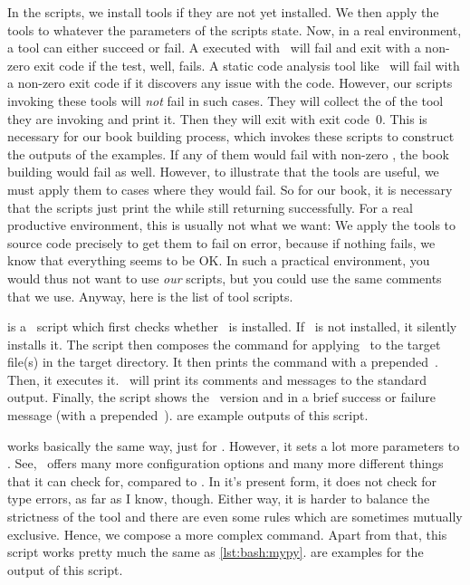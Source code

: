 In the scripts, we install tools if they are not yet installed.
We then apply the tools to whatever the parameters of the scripts state.
Now, in a real environment, a tool can either succeed or fail.
A  executed with \pytest\ will fail and exit with a non-zero exit code if the test, well, fails.
A static code analysis tool like \ruff\ will fail with a non-zero exit code if it discovers any issue with the code.
However, our scripts invoking these tools will \emph{not} fail in such cases.
They will collect the  of the tool they are invoking and print it.
Then they will exit with exit code~0.
This is necessary for our book building process, which invokes these scripts to construct the outputs of the examples.
If any of them would fail with non-zero , the book building would fail as well.
However, to illustrate that the tools are useful, we must apply them to cases where they would fail.
So for our book, it is necessary that the scripts just print the  while still returning successfully.
For a real productive environment, this is usually not what we want:
We apply the tools to source code precisely to get them to fail on error, because if nothing fails, we know that everything seems to be OK.
In such a practical environment, you would thus not want to use \emph{our} scripts, but you could use the same comments that we use.
Anyway, here is the list of tool scripts.

 is a \bash\ script which first checks whether \mypy\ is installed.
If \mypy\ is not installed, it silently installs it.
The script then composes the command for applying \mypy\ to the target file(s) in the target directory.
It then prints the command with a prepended~\expandafter\textil{\$}.
Then, it executes it.
\mypy\ will print its comments and messages to the standard output.
Finally, the script shows the \mypy\ version and  in a brief success or failure message (with a prepended~\expandafter\textil{\#}).
 are example outputs of this script.

 works basically the same way, just for \ruff.
However, it sets a lot more parameters to \ruff.
See, \ruff\ offers many more configuration options and many more different things that it can check for, compared to \mypy.
In it's present form, it does not check for type errors, as far as I know, though.
Either way, it is harder to balance the strictness of the tool and there are even some rules which are sometimes mutually exclusive.
Hence, we compose a more complex command.
Apart from that, this script works pretty much the same as \cref{lst:bash:mypy}.
 are examples for the output of this script.

